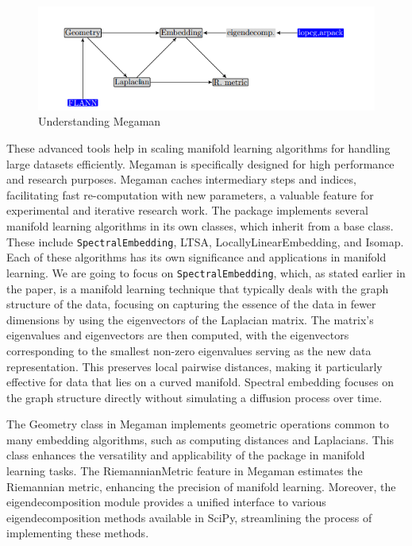 \begin{figure}[H]
    \centering
    \includegraphics[width=0.8\linewidth]{images/megamen.png}
    \caption{Understanding Megaman}
    \label{fig:megaman}
\end{figure}

These advanced tools help in scaling manifold learning algorithms for handling large datasets efficiently. Megaman is specifically designed for high performance and research purposes. Megaman caches intermediary steps and indices, facilitating fast re-computation with new parameters, a valuable feature for experimental and iterative research work. The package implements several manifold learning algorithms in its own classes, which inherit from a base class. These include \texttt{SpectralEmbedding}, LTSA, LocallyLinearEmbedding, and Isomap. Each of these algorithms has its own significance and applications in manifold learning. We are going to focus on \texttt{SpectralEmbedding}, which, as stated earlier in the paper, is a manifold learning technique that typically deals with the graph structure of the data, focusing on capturing the essence of the data in fewer dimensions by using the eigenvectors of the Laplacian matrix. The matrix's eigenvalues and eigenvectors are then computed, with the eigenvectors corresponding to the smallest non-zero eigenvalues serving as the new data representation. This preserves local pairwise distances, making it particularly effective for data that lies on a curved manifold. Spectral embedding focuses on the graph structure directly without simulating a diffusion process over time.

The Geometry class in Megaman implements geometric operations common to many embedding algorithms, such as computing distances and Laplacians. This class enhances the versatility and applicability of the package in manifold learning tasks. The RiemannianMetric feature in Megaman estimates the Riemannian metric, enhancing the precision of manifold learning. Moreover, the eigendecomposition module provides a unified interface to various eigendecomposition methods available in SciPy, streamlining the process of implementing these methods. \\

